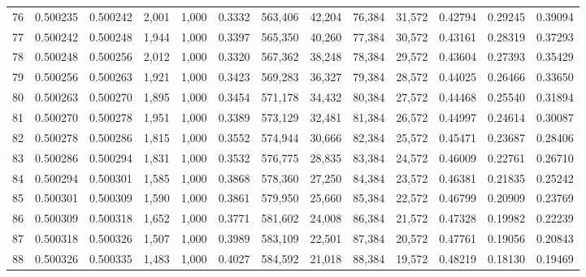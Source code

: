 \begin{tabular}{rrrrrrrrrrrrr}
76  &  0.500235 &  0.500242 &   2,001 &  1,000 &                                     0.3332 &  563,406 &   42,204 &   76,384 &   31,572 &  0.42794 &  0.29245 &  0.39094 \\
77  &  0.500242 &  0.500248 &   1,944 &  1,000 &                                     0.3397 &  565,350 &   40,260 &   77,384 &   30,572 &  0.43161 &  0.28319 &  0.37293 \\
78  &  0.500248 &  0.500256 &   2,012 &  1,000 &                                     0.3320 &  567,362 &   38,248 &   78,384 &   29,572 &  0.43604 &  0.27393 &  0.35429 \\
79  &  0.500256 &  0.500263 &   1,921 &  1,000 &                                     0.3423 &  569,283 &   36,327 &   79,384 &   28,572 &  0.44025 &  0.26466 &  0.33650 \\
80  &  0.500263 &  0.500270 &   1,895 &  1,000 &                                     0.3454 &  571,178 &   34,432 &   80,384 &   27,572 &  0.44468 &  0.25540 &  0.31894 \\
81  &  0.500270 &  0.500278 &   1,951 &  1,000 &                                     0.3389 &  573,129 &   32,481 &   81,384 &   26,572 &  0.44997 &  0.24614 &  0.30087 \\
82  &  0.500278 &  0.500286 &   1,815 &  1,000 &                                     0.3552 &  574,944 &   30,666 &   82,384 &   25,572 &  0.45471 &  0.23687 &  0.28406 \\
83  &  0.500286 &  0.500294 &   1,831 &  1,000 &                                     0.3532 &  576,775 &   28,835 &   83,384 &   24,572 &  0.46009 &  0.22761 &  0.26710 \\
84  &  0.500294 &  0.500301 &   1,585 &  1,000 &                                     0.3868 &  578,360 &   27,250 &   84,384 &   23,572 &  0.46381 &  0.21835 &  0.25242 \\
85  &  0.500301 &  0.500309 &   1,590 &  1,000 &                                     0.3861 &  579,950 &   25,660 &   85,384 &   22,572 &  0.46799 &  0.20909 &  0.23769 \\
86  &  0.500309 &  0.500318 &   1,652 &  1,000 &                                     0.3771 &  581,602 &   24,008 &   86,384 &   21,572 &  0.47328 &  0.19982 &  0.22239 \\
87  &  0.500318 &  0.500326 &   1,507 &  1,000 &                                     0.3989 &  583,109 &   22,501 &   87,384 &   20,572 &  0.47761 &  0.19056 &  0.20843 \\
88  &  0.500326 &  0.500335 &   1,483 &  1,000 &                                     0.4027 &  584,592 &   21,018 &   88,384 &   19,572 &  0.48219 &  0.18130 &  0.19469 \\

\end{tabular}
